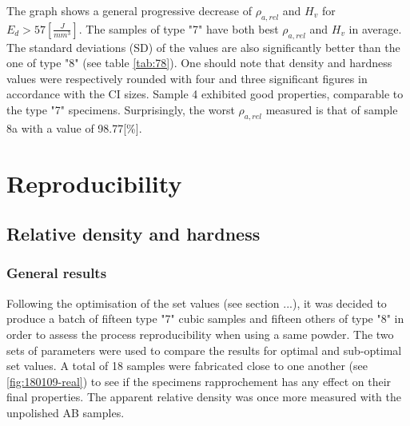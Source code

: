  The graph shows a general progressive decrease of  $\rho_{a,rel}$ and $H_v$ for $E_d>57 [\frac{J}{mm^3}]$. The samples of type "7" have both best $\rho_{a,rel}$ and $H_v$ in average. The standard deviations (SD) of the values are also significantly better than the one of type "8" (see table \ref{tab:78}). One should note that density and hardness values were respectively rounded with four and three significant figures in accordance with the CI sizes. Sample 4 exhibited good properties, comparable to the type "7" specimens. Surprisingly, the worst $\rho_{a,rel}$ measured is that of sample 8a with a value of 98.77[\%].  \\

 \begin{center}
\begin{table}[ht]
\noindent{}

\caption[Standard deviations and average values for apparent relative densities and hardnesses of types "7" and "8" specimens of batch X200-171024]{Standard deviations and average values for apparent relative densities and hardnesses of types "7" and "8" specimens of batch X200-171024}
\label{tab:78}
\end{table}
 \end{center}

\section{Reproducibility}
\label{RReprod}
\subsection{Relative density and hardness}
\subsubsection{General results}
Following the optimisation of the set values (see section ...), it was decided to produce a batch of fifteen type "7" cubic samples and fifteen others of type "8" in order to assess the process reproducibility when using a same powder. The two sets of parameters were used to compare the results for optimal and sub-optimal set values. A total of 18 samples were fabricated close to one another (see \ref{fig:180109-real}) to see if the specimens rapprochement has any effect on their final properties. The apparent relative density was once more measured with the unpolished AB samples.\\

